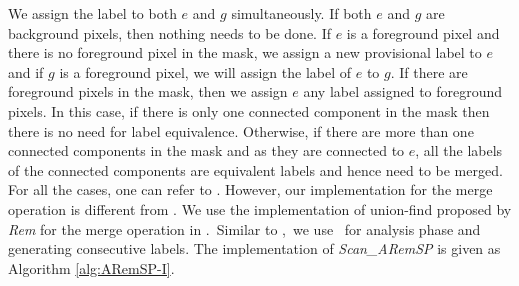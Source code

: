 We assign the label to both $e$ and $g$ simultaneously. If both $e$ and $g$ are
background pixels, then nothing needs to be done. If $e$ is a foreground pixel and there is no foreground pixel in the mask, we assign a 
new provisional label to $e$ and if $g$ is a foreground pixel, we will assign
the label of $e$ to $g$. If there are foreground pixels in the mask, then we assign $e$ any label assigned to 
foreground pixels. In this case, if there is only one connected component in the mask then there is 
no need for label equivalence. Otherwise, if there are more than one connected components in the mask and as 
they are connected to $e$, all the labels of the connected components are
equivalent labels and hence need to be merged. For all the cases, one can refer
to \cite{He2012_ARun}.
However, our implementation for the merge operation is different from \cite{He2012_ARun}.
We use the implementation of union-find proposed by {\em Rem} \cite{Patwary2010_RemSP, Dijkstra1976_RemSP} for the merge operation in
\aremsp.\ Similar to \nremsp,\ we use \flatten\ for analysis phase
and generating consecutive labels. The implementation of {\em Scan\_ARemSP} is given as Algorithm
\ref{alg:ARemSP-I}.

%






 
